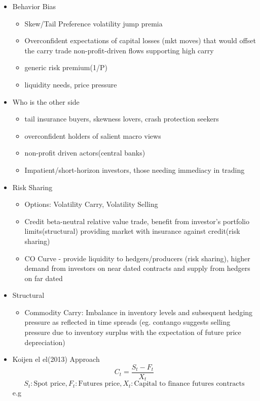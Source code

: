 \documentclass[11pt, openany]{book}              %
\begin{document}
\begin{itemize}
	\item Behavior Bias
	\begin{itemize}
			\item Skew/Tail Preference volatility jump premia
			\item Overconfident expectations of capital losses (mkt moves) that would offset the carry trade non-profit-driven flows supporting high carry
			\item generic risk premium(1/P)
			\item liquidity needs, price pressure
	\end{itemize}
	\item Who is the other side
		\begin{itemize}
			\item tail insurance buyers, skewness lovers, crash protection seekers
			\item overconfident holders of salient macro views
			\item non-profit driven actors(central banks)
			\item Impatient/short-horizon investors, those needing immediacy in trading
		\end{itemize}
	\item Risk Sharing 
		\begin{itemize}
			\item Options: Volatility Carry, Volatility Selling
			\item Credit beta-neutral relative value trade, benefit from investor's portfolio limits(structural) providing market with insurance against credit(risk sharing)
			\item CO Curve - provide liquidity to hedgers/producers (risk sharing), higher demand from investors on near dated contracts and supply from hedgers on far dated
		\end{itemize}
	\item Structural
		\begin{itemize}
			\item Commodity Carry: Imbalance in inventory levels and subsequent hedging pressure as reflected in time spreads (eg. contango suggests selling pressure due to inventory surplus with the expectation of future price depreciation)
		\end{itemize}
	\item Koijen el el(2013) Approach
	$$ C_t = \frac{S_t - F_t}{X_t}$$ $$S_t:\text{Spot price},F_t:\text{Futures price},X_t:\text{Capital to finance futures contracts}$$
	e.g

\end{itemize}
\end{document}
